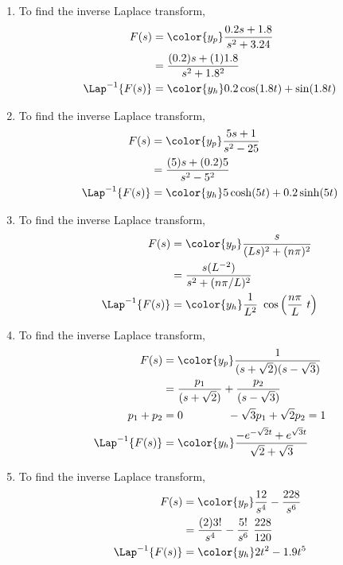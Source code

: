 \begin{enumerate}
    \item To find the inverse Laplace transform,
          \begin{align}
              F(s)              & = \color{y_p} \frac{0.2s + 1.8}{s^2 + 3.24} \\
                                & = \frac{(0.2)s + (1)1.8}{s^2 + 1.8^2}       \\
              \Lap^{-1}\{F(s)\} & = \color{y_h} 0.2\cos(1.8 t) + \sin(1.8 t)
          \end{align}

    \item To find the inverse Laplace transform,
          \begin{align}
              F(s)              & = \color{y_p} \frac{5s + 1}{s^2 - 25}   \\
                                & = \frac{(5)s + (0.2)5}{s^2 - 5^2}       \\
              \Lap^{-1}\{F(s)\} & = \color{y_h} 5\cosh(5t) + 0.2\sinh(5t)
          \end{align}

    \item To find the inverse Laplace transform,
          \begin{align}
              F(s)              & = \color{y_p} \frac{s}{(Ls)^2 + (n\pi)^2} \\
                                & = \frac{s(L^{-2})}{s^2 + (n\pi/L)^2}      \\
              \Lap^{-1}\{F(s)\} & = \color{y_h} \frac{1}{L^2}\ \cos\left(
              \frac{n\pi}{L}\ t \right)
          \end{align}

    \item To find the inverse Laplace transform,
          \begin{align}
              F(s)              & = \color{y_p} \frac{1}{(s+\sqrt{2})(s-\sqrt{3})} \\
                                & = \frac{p_1}{(s+\sqrt{2})}
              + \frac{p_2}{(s-\sqrt{3})}                                           \\
              p_1 + p_2         & = 0 \qquad\qquad -\sqrt{3}p_1 + \sqrt{2}p_2 = 1  \\
              \Lap^{-1}\{F(s)\} & = \color{y_h} \frac{-e^{-\sqrt{2}t}
              + e^{\sqrt{3}t}}{\sqrt{2}+\sqrt{3}}
          \end{align}

    \item To find the inverse Laplace transform,
          \begin{align}
              F(s)              & = \color{y_p} \frac{12}{s^4} - \frac{228}{s^6} \\
                                & = \frac{(2)3!}{s^4}
              - \frac{5!}{s^6}\ \frac{228}{120}                                  \\
              \Lap^{-1}\{F(s)\} & = \color{y_h} 2t^2 - 1.9t^5
          \end{align}


\end{enumerate}

